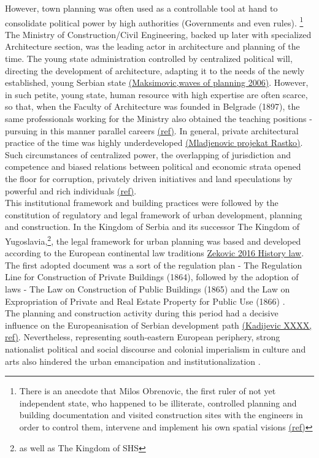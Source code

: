 \documentclass[11pt]{report}
\begin{document}
However, town planning was often used as a controllable tool at hand to consolidate political power by high authorities (Governments and even rules). \footnote{There is an anecdote that Milos Obrenovic, the first ruler of not yet independent state, who happened to be illiterate, controlled planning and building documentation and visited construction sites with the engineers in order to control them, intervene and implement his own spatial visions \href{}{(ref)}}
The Ministry of Construction/Civil Engineering, backed up later with specialized Architecture section, was the leading actor in architecture and planning of the time. The young state administration controlled by centralized political will, directing the development of architecture, adapting it to the needs of the newly established, young Serbian state \href{}{(Maksimovic,waves of planning 2006)}. However, in such petite, young state, human resource with high expertise are often scarce, so that, when the Faculty of Architecture was founded in Belgrade (1897), the same professionals working for the Ministry also obtained the teaching positions - pursuing in this manner parallel careers \href{}{(ref)}. In general, private architectural practice of the time was highly underdeveloped \href{}{(Mladjenovic projekat Rastko)}. Such circumstances of centralized power, the overlapping of jurisdiction and competence and biased relations between political and economic strata opened the floor for corruption, privately driven initiatives and land speculations by powerful and rich individuals \href{}{(ref)}.
\\

This institutional framework and building practices were followed by the constitution of regulatory and legal framework of urban development, planning and construction.
In the Kingdom of Serbia and its successor The Kingdom of Yugoslavia,\footnote{as well as The Kingdom of SHS}, the legal framework for urban planning was based and developed according to the European continental law traditions \href{}{Zekovic 2016 History law}.
The first adopted document was a sort of the regulation plan - The Regulation  Line  for  Construction  of  Private  Buildings (1864), followed by the adoption of laws - The Law on Construction of Public Buildings (1865) and the Law on Expropriation of Private and Real Estate Property for Public Use (1866) \href{}{\citealt{nedovicbudic_waves_2006}}.
\\

The planning and construction activity during this period had a decisive influence on the Europeanisation of Serbian development path \href{}{(Kadijevic XXXX, ref)}. Nevertheless, representing south-eastern European periphery, strong nationalist political and social discourse and colonial imperialism in culture and arts also hindered the urban emancipation and institutionalization \href{}{\citealt{vukmirovic_city_2013}}.
\\
\end{document}
